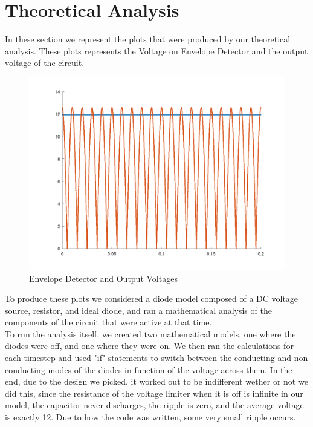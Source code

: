 \section{Theoretical Analysis}
\label{sec:analysis}


In these section we represent the plots that were produced by our theoretical analysis. These plots represents the Voltage on Envelope Detector and the output voltage of the circuit.

\begin{figure} [!htb] 
  \includegraphics[width=\linewidth]{Condensador.png}
  \caption{Envelope Detector and Output Voltages}
  \label{fig:theoplots}
  \endminipage\hfill
\end{figure}

To produce these plots we considered a diode model composed of a DC voltage source, resistor, and ideal diode, and ran a mathematical analysis of the components of the circuit that were active at that time.\\
To run the analysis itself, we created two mathematical models, one where the diodes were off, and one where they were on. We then ran the calculations for each timestep and used "if" statements to switch between the conducting and non conducting modes of the diodes in function of the voltage across them. In the end, due to the design we picked, it worked out to be indifferent wether or not we did this, since the resistance of the voltage limiter when it is off is infinite in our model, the capacitor never discharges, the ripple is zero, and the average voltage is exactly 12. Due to how the code was written, some very small ripple occurs.

